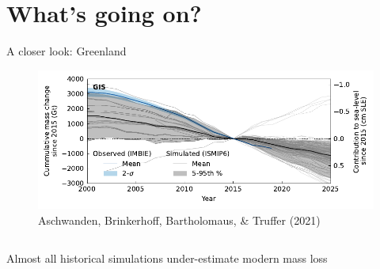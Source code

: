 \documentclass[hide notes,intlimits]{beamer}
\begin{document}
\part{What's going on?}
\frame{\partpage}

\begin{frame}{A closer look: Greenland}
  \begin{figure}
    \includegraphics[width=\textwidth]{GIS_historical}
    \caption{Aschwanden, Brinkerhoff, Bartholomaus, \& Truffer (2021)}
  \end{figure}
  \begin{columns}[c]
    \begin{column}{.5\textwidth}
      \begin{minipage}[t][.5\textheight][t]{\textwidth}
        \alert{Almost all historical simulations under-estimate modern mass loss}
      \end{minipage}
    \end{column}
    \begin{column}{.25\textwidth}
    \end{column}
  \end{columns}
\end{frame}
\end{document}
